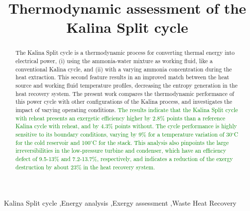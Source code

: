 \documentclass[final,times,3p]{elsarticle}
\begin{document}
\begin{frontmatter}

\title{Thermodynamic assessment of the Kalina Split cycle}


\address{Section of Thermal Energy, Department of Mechanical Engineering, Technical University of Denmark,\\ Building 403, Nils Koppels All\'{e}, 2800 Kongens Lyngby, Denmark}

\begin{abstract}

The Kalina Split cycle is a thermodynamic process for converting thermal energy into electrical power, (i) using the ammonia-water mixture as working fluid, like a conventional Kalina cycle, and (ii) with a varying ammonia concentration during the heat extraction. This second feature results in an improved match between the heat source and working fluid temperature profiles, decreasing the entropy generation in the heat recovery system.  
The present work compares the thermodynamic performance of this power cycle with other configurations of the Kalina process, and investigates the impact of varying operating conditions. \textcolor{green}{The results indicate that the Kalina Split cycle with reheat presents an exergetic efficiency higher by 2.8\% points than a reference Kalina cycle with reheat, and by 4.3\% points without. The cycle performance is highly sensitive to its boundary conditions, varying by 9\% for a temperature variation of 30$^{\circ}$C for the cold reservoir and 100$^{\circ}$C for the stack. This analysis also pinpoints the large irreversibilities in the low-pressure turbine and condenser, which have an efficiency defect of 9.5-13\% and 7.2-13.7\%, respectively, and indicates a reduction of the exergy destruction by about 23\% in the heat recovery system.} 

\end{abstract}

\begin{keyword}
Kalina Split cycle \sep Energy analysis \sep Exergy assessment \sep Waste Heat Recovery 
\end{keyword}

\end{frontmatter}
\end{document}
